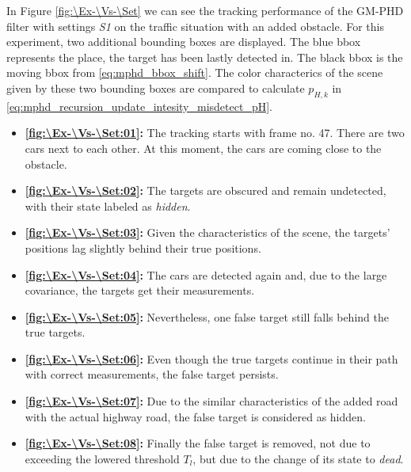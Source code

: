 In Figure \ref{fig:\Ex-\Vs-\Set} we can see the tracking performance of the GM-PHD filter with settings \textit{S1}
on the traffic situation with an added obstacle. For this experiment, two additional bounding boxes are displayed.
The blue bbox represents the place, the target has been lastly detected in. The black bbox is the moving bbox from \eqref{eq:mphd_bbox_shift}. The color characterics of the scene given by these two bounding boxes are compared to calculate $p_{H,k}$ in \eqref{eq:mphd_recursion_update_intesity_misdetect_pH}.
\begin{itemize}
    \item \textbf{\ref{fig:\Ex-\Vs-\Set:01}:} The tracking starts with frame no. 47. There are two cars next to each
    other. At this moment, the cars are coming close to the obstacle.
    \item \textbf{\ref{fig:\Ex-\Vs-\Set:02}:} The targets are obscured and remain undetected, with their state labeled as \textit{hidden}.
    \item \textbf{\ref{fig:\Ex-\Vs-\Set:03}:} Given the characteristics of the scene, the targets' positions lag slightly behind their true positions.
    \item \textbf{\ref{fig:\Ex-\Vs-\Set:04}:} The cars are detected again and, due to the large covariance, the
    targets get their measurements.
    \item \textbf{\ref{fig:\Ex-\Vs-\Set:05}:} Nevertheless, one false target still falls behind the true targets.
    \item \textbf{\ref{fig:\Ex-\Vs-\Set:06}:} Even though the true targets continue in their path with correct measurements, the false target persists.
    \item \textbf{\ref{fig:\Ex-\Vs-\Set:07}:} Due to the similar characteristics of the added road with the actual highway road, the false target is considered as hidden.
    \item \textbf{\ref{fig:\Ex-\Vs-\Set:08}:} Finally the false target is removed, not due to exceeding the lowered threshold $T_l$, but due to the change of its state to \textit{dead}.
\end{itemize}

